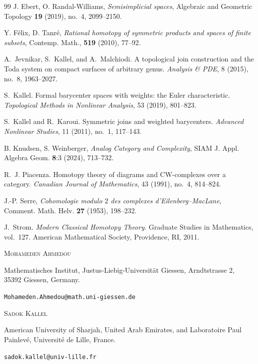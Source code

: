 \documentclass[11pt,a4paper]{article}
\numberwithin{equation}{section}
\theoremstyle{definition}
\theoremstyle{remark}
\begin{document}
\begin{thebibliography}{99}
J. Ebert, O. Randal-Williams,
\textit{Semisimplicial spaces}, Algebraic and Geometric Topology {\bf 19} (2019), no.~4, 2099--2150.

 Y. F\'elix, D. Tanr\'e, \textit{Rational homotopy of symmetric products and spaces of
finite subsets}, Contemp. Math., {\bf 519} (2010), 77--92. 


A.~Jevnikar, S.~Kallel, and A.~Malchiodi.
\newblock A topological join construction and the Toda system on compact surfaces of arbitrary genus.
\newblock \emph{Analysis \& PDE}, 8 (2015), no.~8, 1963--2027.




\par
{}
S.~Kallel.
\newblock Formal barycenter spaces with weights: the Euler characteristic.
\newblock \emph{Topological Methods in Nonlinear Analysis}, 53 (2019), 801--823.

S.~Kallel and R.~Karoui.
\newblock Symmetric joins and weighted barycenters.
\newblock \emph{Advanced Nonlinear Studies}, 11 (2011), no.~1, 117--143.

 B. Knudsen, S. Weinberger,
\textit{Analog Category and Complexity},
{SIAM J. Appl. Algebra Geom.}
{\bf 8}:3 (2024), 713--732.

R.~J. Piacenza.
\newblock Homotopy theory of diagrams and CW-complexes over a category.
\newblock \emph{Canadian Journal of Mathematics}, 43 (1991), no.~4, 814--824.

J.-P. Serre, \emph{Cohomologie modulo $2$ des complexes
d'Eilenberg--MacLane}, Comment. Math. Helv. \textbf{27} (1953),
198--232.

J.~Strom.
\newblock \emph{Modern Classical Homotopy Theory}.
\newblock Graduate Studies in Mathematics, vol.~127. American Mathematical Society, Providence, RI, 2011.

\end{thebibliography}

\begingroup
\footnotesize
\medskip
\noindent
\textsc{Mohameden Ahmedou}\par
Mathematisches Institut, Justus-Liebig-Universit\"at Giessen,
Arndtstrasse 2, 35392 Giessen, Germany.\par
\texttt{Mohameden.Ahmedou@math.uni-giessen.de}

\smallskip
\noindent
\textsc{Sadok Kallel}\par
American University of Sharjah, United Arab Emirates, and
Laboratoire Paul Painlev\'e, Universit\'e de Lille, France.\par
\texttt{sadok.kallel@univ-lille.fr}
\endgroup
\end{document}
